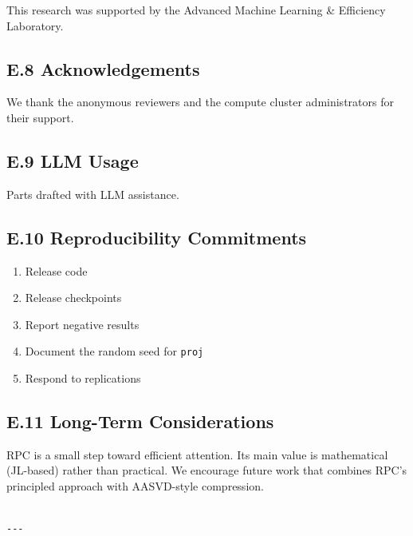 This research was supported by the Advanced Machine Learning \& Efficiency Laboratory.

\subsection{E.8 Acknowledgements}

We thank the anonymous reviewers and the compute cluster administrators for their support.

\subsection{E.9 LLM Usage}

Parts drafted with LLM assistance.

\subsection{E.10 Reproducibility Commitments}

\begin{enumerate}
\item Release code
\item Release checkpoints
\item Report negative results
\item Document the random seed for \texttt{proj}
\item Respond to replications

\end{enumerate}
\subsection{E.11 Long-Term Considerations}

RPC is a small step toward efficient attention. Its main value is 
mathematical (JL-based) rather than practical. We encourage future work 
that combines RPC's principled approach with AASVD-style compression.
\begin{lstlisting}

---
\end{lstlisting}